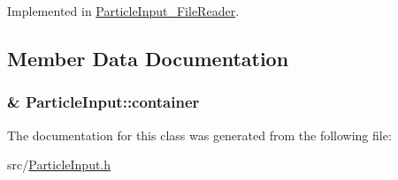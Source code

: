 Implemented in \hyperlink{classParticleInput__FileReader_a67b437a1f7ff4e5a63d437ece6319257}{Particle\-Input\-\_\-\-File\-Reader}.



\subsection{Member Data Documentation}
\hypertarget{classParticleInput_ab273aa8b897a17ed79f1b40082056dae}{
\subsubsection[{container}]{\& Particle\-Input\-::container\hspace{0.3cm}{\ttfamily [protected]}}}\label{classParticleInput_ab273aa8b897a17ed79f1b40082056dae}


The documentation for this class was generated from the following file\-:\begin{DoxyCompactItemize}
\item 
src/\hyperlink{ParticleInput_8h}{Particle\-Input.\-h}\end{DoxyCompactItemize}
